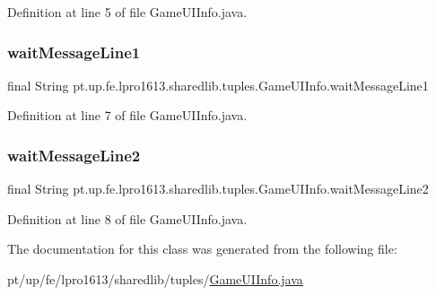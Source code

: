 Definition at line 5 of file Game\+U\+I\+Info.\+java.

\hypertarget{classpt_1_1up_1_1fe_1_1lpro1613_1_1sharedlib_1_1tuples_1_1_game_u_i_info_a088ba8d6af2fd0abdcee747a70784831}{}\label{classpt_1_1up_1_1fe_1_1lpro1613_1_1sharedlib_1_1tuples_1_1_game_u_i_info_a088ba8d6af2fd0abdcee747a70784831} 
\subsubsection{\texorpdfstring{wait\+Message\+Line1}{waitMessageLine1}}
{\footnotesize\ttfamily final String pt.\+up.\+fe.\+lpro1613.\+sharedlib.\+tuples.\+Game\+U\+I\+Info.\+wait\+Message\+Line1}



Definition at line 7 of file Game\+U\+I\+Info.\+java.

\hypertarget{classpt_1_1up_1_1fe_1_1lpro1613_1_1sharedlib_1_1tuples_1_1_game_u_i_info_aba46c97ac32127ca310d7c0a99206075}{}\label{classpt_1_1up_1_1fe_1_1lpro1613_1_1sharedlib_1_1tuples_1_1_game_u_i_info_aba46c97ac32127ca310d7c0a99206075} 
\subsubsection{\texorpdfstring{wait\+Message\+Line2}{waitMessageLine2}}
{\footnotesize\ttfamily final String pt.\+up.\+fe.\+lpro1613.\+sharedlib.\+tuples.\+Game\+U\+I\+Info.\+wait\+Message\+Line2}



Definition at line 8 of file Game\+U\+I\+Info.\+java.



The documentation for this class was generated from the following file\+:\begin{DoxyCompactItemize}
\item 
pt/up/fe/lpro1613/sharedlib/tuples/\hyperlink{_game_u_i_info_8java}{Game\+U\+I\+Info.\+java}\end{DoxyCompactItemize}
